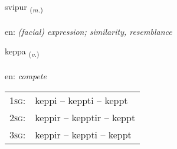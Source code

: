 \documentclass[frontgrid, backgrid]{flacards}\usepackage[]{graphicx}\usepackage[]{color}
\begin{document}
\renewcommand{\flhead}{\vskip5pt \fboxsep=0pt {\small\bfseries\footnotesize Nafnorð | Noun}}
\renewcommand{\fcfoot}{\vskip5pt \fboxsep=0pt \hspace{2pt}{\small\bfseries\footnotesize 2K}}

\renewcommand{\blhead}{\vskip5pt {\small\bfseries\footnotesize Nafnorð | Noun }}
\renewcommand{\bcfoot}{\vskip5pt \hspace{2pt}{\small\bfseries\footnotesize 2K}}


{svipur \small{\textsubscript{(\textit{m.})}} \\[1ex] %
\textphonetic{[svɪːpʏr]} \\
en: \emph{(facial) expression; similarity, resemblance} \\  [2ex]
\renewcommand*{\arraystretch}{0.8}
}

\renewcommand{\flhead}{\vskip5pt \fboxsep=0pt {\small\bfseries\footnotesize Sagnorð | Verb}}
\renewcommand{\fcfoot}{\vskip5pt \fboxsep=0pt \hspace{2pt}{\small\bfseries\footnotesize 2K}}

\renewcommand{\blhead}{\vskip5pt {\small\bfseries\footnotesize Sagnorð | Verb }}
\renewcommand{\bcfoot}{\vskip5pt \hspace{2pt}{\small\bfseries\footnotesize 2K}}


{keppa \small{\textsubscript{(\textit{v.})}} \\[1ex] %
\textphonetic{[cʰɛhpa]} \\
en: \emph{compete} \\  [2ex]
\renewcommand*{\arraystretch}{0.8}
\begin{tabular}{p{1cm}l}
\textsc{1sg}: & keppi -- keppti -- keppt \\ 
\textsc{2sg}: & keppir -- kepptir -- keppt \\ 
\textsc{3sg}: & keppir -- keppti -- keppt \\ 
\end{tabular}
}
\end{document}
